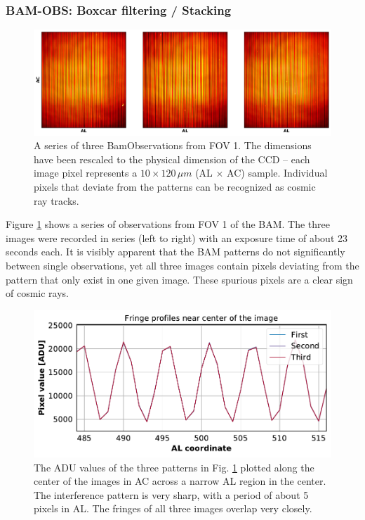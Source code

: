 \documentclass[a4paper, 11pt]{article}
\begin{document}
\subsubsection{BAM-OBS: Boxcar filtering / Stacking}
\begin{figure}
  \centering
  \includegraphics[width=\textwidth]{images/BAM-OBS_patterns}
  \caption{A series of three BamObservations from FOV 1. The dimensions have been rescaled to the physical dimension of the CCD -- each image pixel represents a $10 \times 120\, \mu m$ (AL $\times$ AC) sample. Individual pixels that deviate from the patterns can be recognized as cosmic ray tracks.}
  \label{fig:BAM_patterns}
\end{figure}

Figure \ref{fig:BAM_patterns} shows a series of observations from FOV 1 of the BAM. The three images were recorded in series (left to right) with an exposure time of about 23 seconds each. It is visibly apparent that the BAM patterns do not significantly between single observations, yet all three images contain pixels deviating from the pattern that only exist in one given image. These spurious pixels are a clear sign of cosmic rays.

\begin{figure}
  \centering
  \includegraphics{images/BAM-OBS_fringes}
  \caption{The ADU values of the three patterns in Fig. \ref{fig:BAM_patterns} plotted along the center of the images in AC across a narrow AL region in the center. The interference pattern is very sharp, with a period of about 5 pixels in AL. The fringes of all three images overlap very closely.}
  \label{fig:BAM_fringes}
\end{figure}
\end{document}
